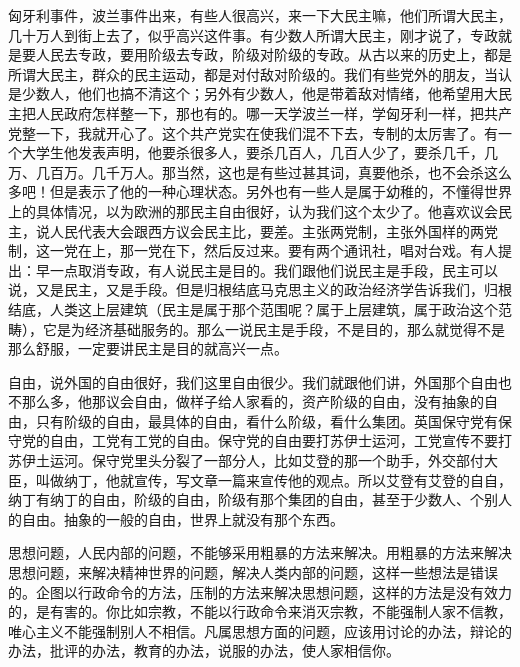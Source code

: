 匈牙利事件，波兰事件出来，有些人很高兴，来一下大民主嘛，他们所谓大民主，几十万人到街上去了，似乎高兴这件事。有少数人所谓大民主，刚才说了，专政就是要人民去专政，要用阶级去专政，阶级对阶级的专政。从古以来的历史上，都是所谓大民主，群众的民主运动，都是对付敌对阶级的。我们有些党外的朋友，当认是少数人，他们也搞不清这个；另外有少数人，他是带着敌对情绪，他希望用大民主把人民政府怎样整一下，那也有的。哪一天学波兰一样，学匈牙利一样，把共产党整一下，我就开心了。这个共产党实在使我们混不下去，专制的太厉害了。有一个大学生他发表声明，他要杀很多人，要杀几百人，几百人少了，要杀几千，几万、几百万。几千万人。那当然，这也是有些过甚其词，真要他杀，也不会杀这么多吧！但是表示了他的一种心理状态。另外也有一些人是属于幼稚的，不懂得世界上的具体情况，以为欧洲的那民主自由很好，认为我们这个太少了。他喜欢议会民主，说人民代表大会跟西方议会民主比，要差。主张两党制，主张外国样的两党制，这一党在上，那一党在下，然后反过来。要有两个通讯社，唱对台戏。有人提出：早一点取消专政，有人说民主是目的。我们跟他们说民主是手段，民主可以说，又是民主，又是手段。但是归根结底马克思主义的政治经济学告诉我们，归根结底，人类这上层建筑（民主是属于那个范围呢？属于上层建筑，属于政治这个范畴），它是为经济基础服务的。那么一说民主是手段，不是目的，那么就觉得不是那么舒服，一定要讲民主是目的就高兴一点。

自由，说外国的自由很好，我们这里自由很少。我们就跟他们讲，外国那个自由也不那么多，他那议会自由，做样子给人家看的，资产阶级的自由，没有抽象的自由，只有阶级的自由，最具体的自由，看什么阶级，看什么集团。英国保守党有保守党的自由，工党有工党的自由。保守党的自由要打苏伊士运河，工党宣传不要打苏伊土运河。保守党里头分裂了一部分人，比如艾登的那一个助手，外交部付大臣，叫做纳丁，他就宣传，写文章一篇来宣传他的观点。所以艾登有艾登的自自，纳丁有纳丁的自由，阶级的自由，阶级有那个集团的自由，甚至于少数人、个别人的自由。抽象的一般的自由，世界上就没有那个东西。

思想问题，人民内部的问题，不能够采用粗暴的方法来解决。用粗暴的方法来解决思想问题，来解决精神世界的问题，解决人类内部的问题，这样一些想法是错误的。企图以行政命令的方法，压制的方法来解决思想问题，这样的方法是没有效力的，是有害的。你比如宗教，不能以行政命令来消灭宗教，不能强制人家不信教，唯心主义不能强制别人不相信。凡属思想方面的问题，应该用讨论的办法，辩论的办法，批评的办法，教育的办法，说服的办法，使人家相信你。

